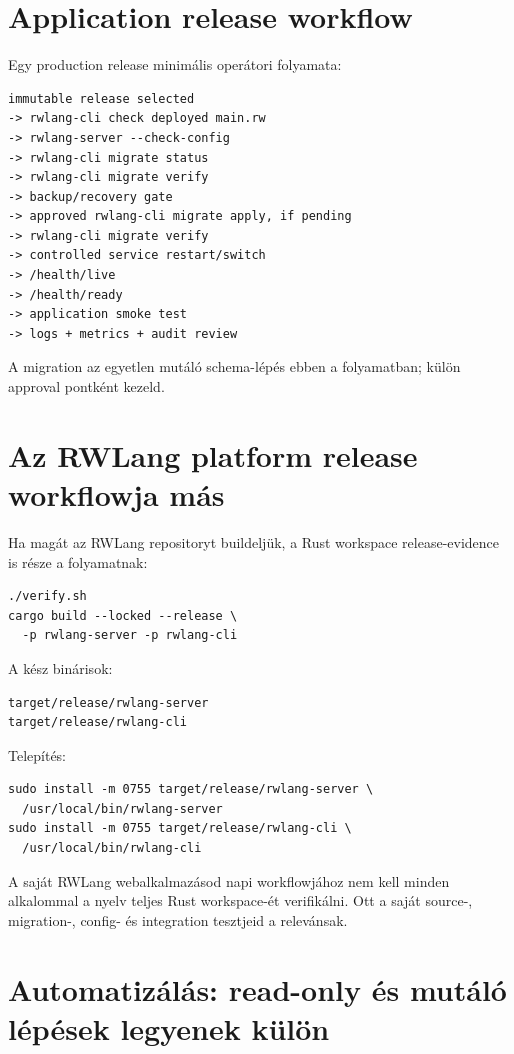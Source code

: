 \section{Application release workflow}

Egy production release minimális operátori folyamata:

\begin{lstlisting}
immutable release selected
-> rwlang-cli check deployed main.rw
-> rwlang-server --check-config
-> rwlang-cli migrate status
-> rwlang-cli migrate verify
-> backup/recovery gate
-> approved rwlang-cli migrate apply, if pending
-> rwlang-cli migrate verify
-> controlled service restart/switch
-> /health/live
-> /health/ready
-> application smoke test
-> logs + metrics + audit review
\end{lstlisting}

A migration  az egyetlen mutáló schema-lépés ebben a folyamatban; külön approval pontként kezeld.

\section{Az RWLang platform release workflowja más}

Ha magát az RWLang repositoryt buildeljük, a Rust workspace release-evidence is része a folyamatnak:

\begin{lstlisting}
./verify.sh
cargo build --locked --release \
  -p rwlang-server -p rwlang-cli
\end{lstlisting}

A kész binárisok:

\begin{lstlisting}
target/release/rwlang-server
target/release/rwlang-cli
\end{lstlisting}

Telepítés:

\begin{lstlisting}
sudo install -m 0755 target/release/rwlang-server \
  /usr/local/bin/rwlang-server
sudo install -m 0755 target/release/rwlang-cli \
  /usr/local/bin/rwlang-cli
\end{lstlisting}

A saját RWLang webalkalmazásod napi workflowjához nem kell minden alkalommal a nyelv teljes Rust workspace-ét verifikálni. Ott a saját source-, migration-, config- és integration tesztjeid a relevánsak.

\section{Automatizálás: read-only és mutáló lépések legyenek külön}

